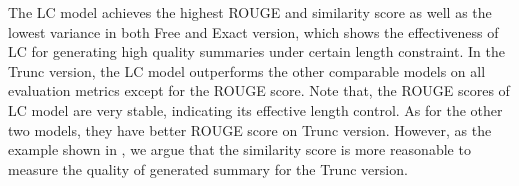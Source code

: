 The LC model achieves the highest ROUGE and similarity score
as well as the lowest variance
in both Free and Exact version,
which shows the effectiveness of LC for generating 
high quality summaries under certain length constraint. 
In the Trunc version, the LC model outperforms the other 
comparable models on all evaluation metrics
except for the ROUGE score.
Note that, the ROUGE scores of LC model are
very stable, indicating its effective length control.
As for the other two models, 
they have better ROUGE score on Trunc version. 
However, as the example shown in , 
we argue that the similarity score is more reasonable 
to measure the quality of generated summary 
for the Trunc version. 

